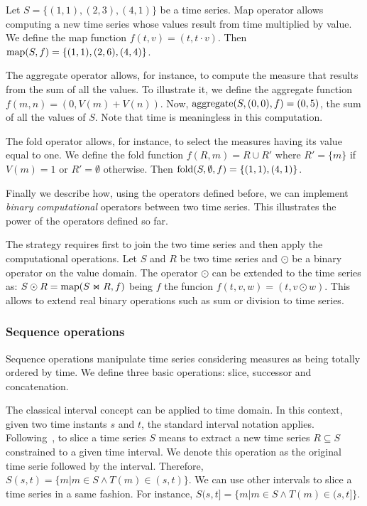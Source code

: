 \begin{example}
\label{ex:computational-operators}
Let $S=\{(1,1),(2,3),(4,1)\}$ be a time series.  Map operator allows
computing a new time series whose values result from time multiplied
by value.  We define the map function $f(t,v)=(t,t\cdot v)$. Then
$\operatorname*{map}(S,f)=\{(1,1),(2,6),(4,4)\}$.  
%

The aggregate operator allows, for instance, to compute the measure
that results from the sum of all the values.  To illustrate it, we
define the aggregate function $f(m,n)=(0,V(m)+V(n))$. Now,
$\operatorname*{aggregate}(S,(0,0),f) = (0,5)$, the sum of all the values of $S$. Note that
time is meaningless in this computation.

The fold operator allows, for instance, to select the measures having
its value equal to one.  We define the fold function $f(R,m)=R\cup R'$
where $R'=\{m\}$ if $V(m)=1$ or $R'=\emptyset$ otherwise. Then
$\operatorname*{fold}(S,\emptyset,f)=\{(1,1),(4,1)\}$.
\end{example}


Finally we describe how, using the operators defined before, we can
implement \emph{binary computational} operators between two time
series. This illustrates the power of the operators defined so far.
%

The strategy requires first to join the two time series and then
apply the computational operations. 
%
Let $S$ and $R$ be two time series and $\odot$ be a binary operator on
the value domain. The operator $\odot$ can be extended to the time
series as:
%
$S\odot R=\operatorname*{map}(S\Join R, f)$ being $f$ the funcion
$f(t,v,w)=(t,v\odot w)$.
%
This allows to extend real binary operations such as sum or division
to time series.  


\subsubsection{Sequence operations}

Sequence operations manipulate time series considering measures as
being totally ordered by time.  We define three basic operations:
slice, successor and concatenation.


The classical interval concept can be applied to time domain. In this
context, given two time instants $s$ and $t$, the standard interval
notation applies.
%
Following~\cite{last:hetland}, to slice a time series $S$ means to
extract a new time series $R\subseteq S$ constrained to a given time
interval. We denote this operation as the original time serie followed
by the interval. Therefore, $S(s,t)=\{m|m\in S \wedge
T(m)\in(s,t)\}$. We can use other intervals to slice a time series in
a same fashion. For instance, $S(s,t]=\{m|m\in S \wedge
T(m)\in(s,t]\}$.


